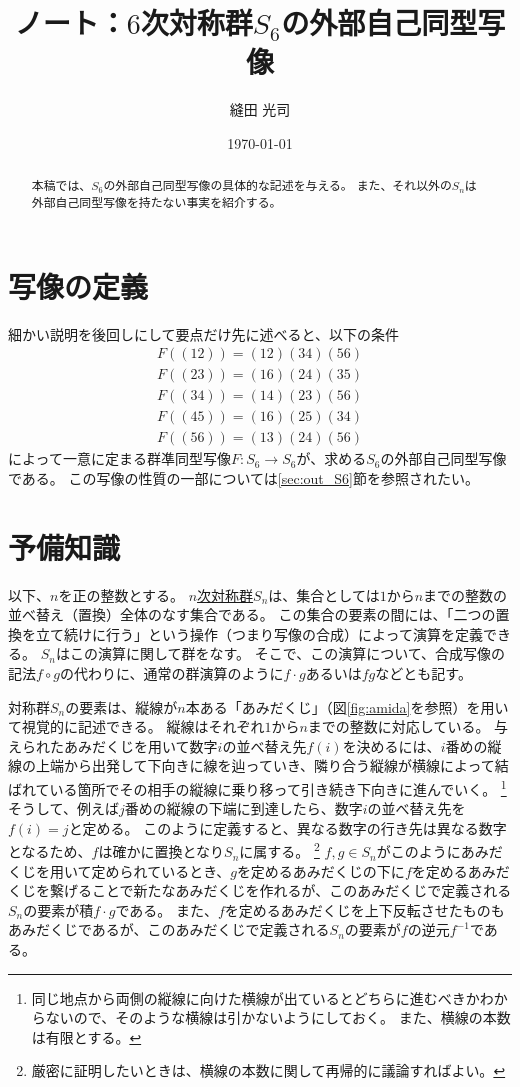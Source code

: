 \documentclass[11pt]{jarticle}
\title{ノート：$6$次対称群$S_6$の外部自己同型写像}
\author{縫田 光司}
\date{\today}
\begin{document}
\maketitle

\begin{abstract}
本稿では、$S_6$の外部自己同型写像の具体的な記述を与える。
また、それ以外の$S_n$は外部自己同型写像を持たない事実を紹介する。
\end{abstract}

\section{写像の定義}
\label{sec:the_map}

細かい説明を後回しにして要点だけ先に述べると、以下の条件
\begin{displaymath}
\begin{split}
F((12)) = (12)(34)(56) \\
F((23)) = (16)(24)(35) \\
F((34)) = (14)(23)(56) \\
F((45)) = (16)(25)(34) \\
F((56)) = (13)(24)(56)
\end{split}
\end{displaymath}
によって一意に定まる群凖同型写像$F \colon S_6 \to S_6$が、求める$S_6$の外部自己同型写像である。
この写像の性質の一部については\ref{sec:out_S6}節を参照されたい。

\section{予備知識}
\label{sec:preliminary}

以下、$n$を正の整数とする。
\underline{$n$次対称群}$S_n$は、集合としては$1$から$n$までの整数の並べ替え（置換）全体のなす集合である。
この集合の要素の間には、「二つの置換を立て続けに行う」という操作（つまり写像の合成）によって演算を定義できる。
$S_n$はこの演算に関して群をなす。
そこで、この演算について、合成写像の記法$f \circ g$の代わりに、通常の群演算のように$f \cdot g$あるいは$fg$などとも記す。

対称群$S_n$の要素は、縦線が$n$本ある「あみだくじ」（図\ref{fig:amida}を参照）を用いて視覚的に記述できる。
縦線はそれぞれ$1$から$n$までの整数に対応している。
与えられたあみだくじを用いて数字$i$の並べ替え先$f(i)$を決めるには、$i$番めの縦線の上端から出発して下向きに線を辿っていき、隣り合う縦線が横線によって結ばれている箇所でその相手の縦線に乗り移って引き続き下向きに進んでいく。%
\footnote{同じ地点から両側の縦線に向けた横線が出ているとどちらに進むべきかわからないので、そのような横線は引かないようにしておく。
また、横線の本数は有限とする。}
そうして、例えば$j$番めの縦線の下端に到達したら、数字$i$の並べ替え先を$f(i) = j$と定める。
このように定義すると、異なる数字の行き先は異なる数字となるため、$f$は確かに置換となり$S_n$に属する。%
\footnote{厳密に証明したいときは、横線の本数に関して再帰的に議論すればよい。}
$f,g \in S_n$がこのようにあみだくじを用いて定められているとき、$g$を定めるあみだくじの下に$f$を定めるあみだくじを繋げることで新たなあみだくじを作れるが、このあみだくじで定義される$S_n$の要素が積$f \cdot g$である。
また、$f$を定めるあみだくじを上下反転させたものもあみだくじであるが、このあみだくじで定義される$S_n$の要素が$f$の逆元$f^{-1}$である。
\end{document}
